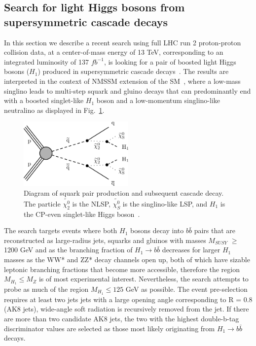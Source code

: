 \documentclass{blois}
\begin{document}
\subsection{Search for light Higgs bosons from supersymmetric cascade decays}
In this section we describe a recent search using full LHC run 2 proton-proton collision data, at a center-of-mass energy of 13 TeV, corresponding to an integrated luminosity of 137 $fb^{-1}$, is looking for a pair of boosted light Higgs bosons ($H_{1}$) produced in supersymmetric cascade decays~\cite{CMS-PAS-HIG-20-018}. The results are interpreted in the context of NMSSM extension of the SM~\cite{ELLWANGER20101}, where a low-mass singlino leads to multi-step squark and gluino decays that can predominantly end with a boosted singlet-like $H_{1}$ boson and a low-momentum singlino-like neutralino as displayed in Fig.~\ref{fig:susy_diagram}.

\begin{figure}[!htb]
    \begin{center}
        \includegraphics[width=0.5\textwidth]{CMS-PAS-HIG-20-018_Figure_001.png}
        \caption{
            Diagram of squark pair production and subsequent cascade decay. The particle $\tilde{\chi_{2}^{0}}$ is the NLSP,  $\tilde{\chi_{S}^{0}}$ is the singlino-like LSP, and $H_{1}$ is the CP-even singlet-like Higgs boson~\protect\cite{CMS-PAS-HIG-20-018}.
        }
        \label{fig:susy_diagram}
    \end{center}
\end{figure}

The search targets events where both $H_{1}$ bosons decay into $b\bar{b}$ pairs that are reconstructed as large-radius jets, squarks and gluinos with masses $M_{SUSY}$ $\geq$ 1200 GeV and as the branching fraction of $H_{1} \rightarrow b\bar{b}$ decreases for larger $H_{1}$ masses as the WW* and ZZ* decay channels open up, both of which have sizable leptonic branching fractions that become more accessible, therefore the region $M_{{H}_{1}} \leq M_{Z}$ is of most experimental interest. Nevertheless, the search attempts to probe as much of the region  $M_{{H}_{1}} \leq 125$ GeV as possible.
The event pre-selection requires at least two jets jets with a large opening angle corresponding to R = 0.8
(AK8 jets), wide-angle soft radiation is recursively removed from the jet. If there are more than two
candidate AK8 jets, the two with the highest double-b-tag discriminator values are selected
as those most likely originating from $H_{1} \rightarrow b\bar{b}$ decays. %
\end{document}
